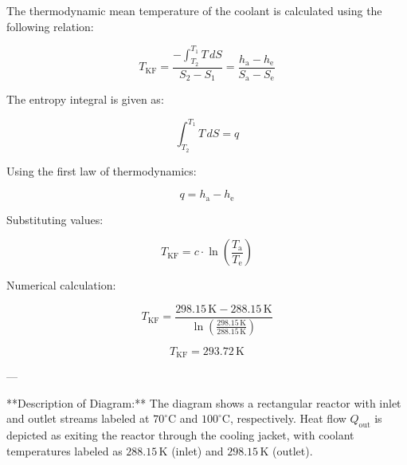 The thermodynamic mean temperature of the coolant is calculated using the following relation:  

\[
T_{\text{KF}} = \frac{-\int_{T_2}^{T_1} T \, dS}{S_2 - S_1} = \frac{h_{\text{a}} - h_{\text{e}}}{S_{\text{a}} - S_{\text{e}}}
\]  

The entropy integral is given as:  

\[
\int_{T_2}^{T_1} T \, dS = q
\]  

Using the first law of thermodynamics:  

\[
q = h_{\text{a}} - h_{\text{e}}
\]  

Substituting values:  

\[
T_{\text{KF}} = c \cdot \ln \left( \frac{T_{\text{a}}}{T_{\text{e}}} \right)
\]  

Numerical calculation:  

\[
T_{\text{KF}} = \frac{298.15 \, \text{K} - 288.15 \, \text{K}}{\ln \left( \frac{298.15 \, \text{K}}{288.15 \, \text{K}} \right)}
\]  

\[
T_{\text{KF}} = 293.72 \, \text{K}
\]  

---

**Description of Diagram:**  
The diagram shows a rectangular reactor with inlet and outlet streams labeled at \( 70^\circ\text{C} \) and \( 100^\circ\text{C} \), respectively. Heat flow \( Q_{\text{out}} \) is depicted as exiting the reactor through the cooling jacket, with coolant temperatures labeled as \( 288.15 \, \text{K} \) (inlet) and \( 298.15 \, \text{K} \) (outlet).